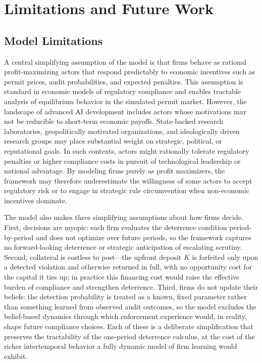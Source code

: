 
\section{Limitations and Future Work}
\label{sec:limitations}

 

\subsection{Model Limitations}
A central simplifying assumption of the model is that firms behave as rational profit-maximizing actors that respond predictably to economic incentives such as permit prices, audit probabilities, and expected penalties. This assumption is standard in economic models of regulatory compliance and enables tractable analysis of equilibrium behavior in the simulated permit market. However, the landscape of advanced AI development includes actors whose motivations may not be reducible to short-term economic payoffs. State-backed research laboratories, geopolitically motivated organizations, and ideologically driven research groups may place substantial weight on strategic, political, or reputational goals. In such contexts, actors might rationally tolerate regulatory penalties or higher compliance costs in pursuit of technological leadership or national advantage. By modeling firms purely as profit maximizers, the framework may therefore underestimate the willingness of some actors to accept regulatory risk or to engage in strategic rule circumvention when non-economic incentives dominate.

The model also makes three simplifying assumptions about how firms decide. First, decisions are myopic: each firm evaluates the deterrence condition period-by-period and does not optimize over future periods, so the framework captures no forward-looking deterrence or strategic anticipation of escalating scrutiny. Second, collateral is costless to post---the upfront deposit $K$ is forfeited only upon a detected violation and otherwise returned in full, with no opportunity cost for the capital it ties up; in practice this financing cost would raise the effective burden of compliance and strengthen deterrence. Third, firms do not update their beliefs: the detection probability is treated as a known, fixed parameter rather than something learned from observed audit outcomes, so the model excludes the belief-based dynamics through which enforcement experience would, in reality, shape future compliance choices. Each of these is a deliberate simplification that preserves the tractability of the one-period deterrence calculus, at the cost of the richer intertemporal behavior a fully dynamic model of firm learning would exhibit.

